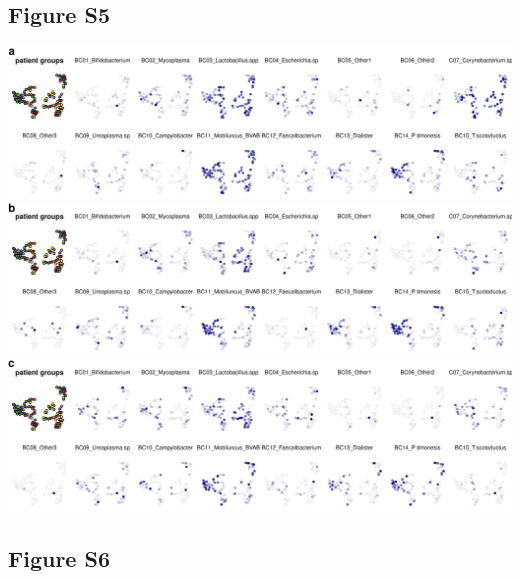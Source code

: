 \documentclass[
]{article}
\begin{document}
\clearpage

\hypertarget{figure-s5}{%
\subsection{Figure S5}\label{figure-s5}}

\includegraphics[width=1\linewidth]{manuscript_template_files/figure-latex/unnamed-chunk-14-1}
\includegraphics[width=1\linewidth]{manuscript_template_files/figure-latex/unnamed-chunk-14-2}
\includegraphics[width=1\linewidth]{manuscript_template_files/figure-latex/unnamed-chunk-14-3}

\clearpage

\hypertarget{figure-s6}{%
\subsection{Figure S6}\label{figure-s6}}
\end{document}
